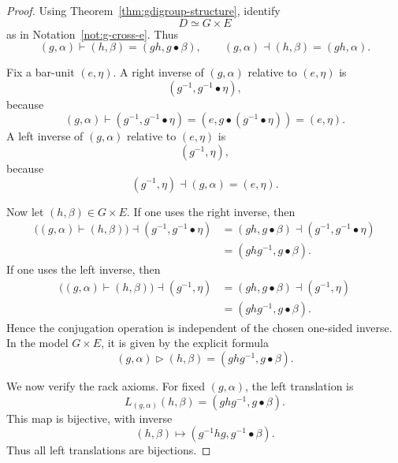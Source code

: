 \documentclass[11pt]{article}
\theoremstyle{plain}
\theoremstyle{definition}
\theoremstyle{remark}
\begin{document}
	\begin{proof}
		Using Theorem~\ref{thm:gdigroup-structure}, identify
		\[
		D\simeq G\times E
		\]
		as in Notation~\ref{not:g-cross-e}. Thus
		\[
		(g,\alpha)\vdash(h,\beta)
		=
		(gh,g\bullet\beta),
		\qquad
		(g,\alpha)\dashv(h,\beta)
		=
		(gh,\alpha).
		\]
		
		Fix a bar-unit \((e,\eta)\). A right inverse of \((g,\alpha)\) relative to
		\((e,\eta)\) is
		\[
		(g^{-1},g^{-1}\bullet\eta),
		\]
		because
		\[
		(g,\alpha)\vdash(g^{-1},g^{-1}\bullet\eta)
		=
		(e,g\bullet(g^{-1}\bullet\eta))
		=
		(e,\eta).
		\]
		A left inverse of \((g,\alpha)\) relative to \((e,\eta)\) is
		\[
		(g^{-1},\eta),
		\]
		because
		\[
		(g^{-1},\eta)\dashv(g,\alpha)
		=
		(e,\eta).
		\]
		
		Now let \((h,\beta)\in G\times E\). If one uses the right inverse, then
		\begin{align*}
			\bigl((g,\alpha)\vdash(h,\beta)\bigr)
			\dashv
			(g^{-1},g^{-1}\bullet\eta)
			&=
			(gh,g\bullet\beta)\dashv(g^{-1},g^{-1}\bullet\eta)\\
			&=
			(ghg^{-1},g\bullet\beta).
		\end{align*}
		If one uses the left inverse, then
		\begin{align*}
			\bigl((g,\alpha)\vdash(h,\beta)\bigr)
			\dashv
			(g^{-1},\eta)
			&=
			(gh,g\bullet\beta)\dashv(g^{-1},\eta)\\
			&=
			(ghg^{-1},g\bullet\beta).
		\end{align*}
		Hence the conjugation operation is independent of the chosen one-sided
		inverse. In the model \(G\times E\), it is given by the explicit formula
		\begin{equation}\label{eq:conj-rack-formula}
			(g,\alpha)\triangleright(h,\beta)
			=
			(ghg^{-1},g\bullet\beta).
		\end{equation}
		
		We now verify the rack axioms. For fixed \((g,\alpha)\), the left
		translation is
		\[
		L_{(g,\alpha)}(h,\beta)
		=
		(ghg^{-1},g\bullet\beta).
		\]
		This map is bijective, with inverse
		\[
		(h,\beta)
		\longmapsto
		(g^{-1}hg,g^{-1}\bullet\beta).
		\]
		Thus all left translations are bijections.
		

\end{proof}
\end{document}
